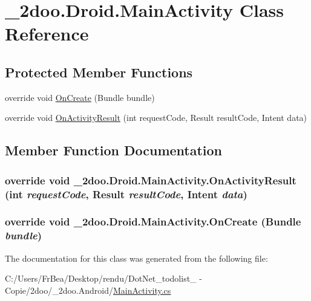 \hypertarget{class__2doo_1_1_droid_1_1_main_activity}{
\section{\_\-2doo.Droid.MainActivity Class Reference}
\label{class__2doo_1_1_droid_1_1_main_activity}
}
\subsection*{Protected Member Functions}
\begin{CompactItemize}
\item 
override void \hyperlink{class__2doo_1_1_droid_1_1_main_activity_989111af249d98f448a7812c29797fe1}{OnCreate} (Bundle bundle)
\item 
override void \hyperlink{class__2doo_1_1_droid_1_1_main_activity_0426fbce6aa967b9660726555d8229b5}{OnActivityResult} (int requestCode, Result resultCode, Intent data)
\end{CompactItemize}


\subsection{Member Function Documentation}
\hypertarget{class__2doo_1_1_droid_1_1_main_activity_0426fbce6aa967b9660726555d8229b5}{
\subsubsection[{OnActivityResult}]{\setlength{\rightskip}{0pt plus 5cm}override void \_\-2doo.Droid.MainActivity.OnActivityResult (int {\em requestCode}, \/  Result {\em resultCode}, \/  Intent {\em data})}}
\label{class__2doo_1_1_droid_1_1_main_activity_0426fbce6aa967b9660726555d8229b5}


\hypertarget{class__2doo_1_1_droid_1_1_main_activity_989111af249d98f448a7812c29797fe1}{
\subsubsection[{OnCreate}]{\setlength{\rightskip}{0pt plus 5cm}override void \_\-2doo.Droid.MainActivity.OnCreate (Bundle {\em bundle})}}
\label{class__2doo_1_1_droid_1_1_main_activity_989111af249d98f448a7812c29797fe1}




The documentation for this class was generated from the following file:\begin{CompactItemize}
\item 
C:/Users/FrBea/Desktop/rendu/DotNet\_\-todolist\_ - Copie/2doo/\_\-2doo.Android/\hyperlink{_main_activity_8cs}{MainActivity.cs}\end{CompactItemize}
